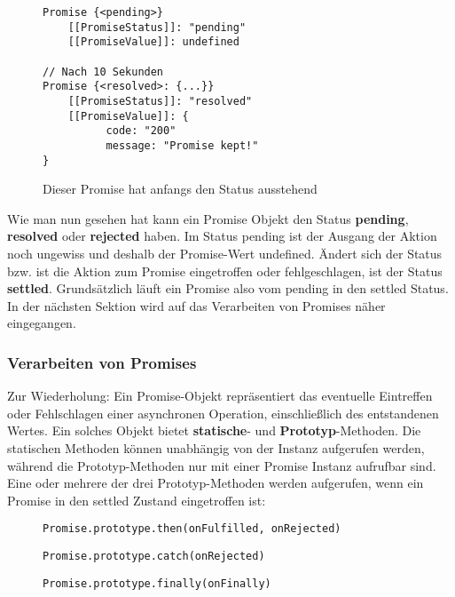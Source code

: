 \begin{figure}[H]
\begin{lstlisting}[basicstyle=\small]
Promise {<pending>}
    [[PromiseStatus]]: "pending"
    [[PromiseValue]]: undefined
    
// Nach 10 Sekunden
Promise {<resolved>: {...}}
    [[PromiseStatus]]: "resolved"
    [[PromiseValue]]: {
          code: "200"
          message: "Promise kept!"
}
\end{lstlisting}
\caption{Dieser Promise hat anfangs den Status \glqq{}ausstehend\grqq{}}
\end{figure}

\noindent
Wie man nun gesehen hat kann ein Promise Objekt den Status \textbf{pending}, \textbf{resolved} oder \textbf{rejected} haben. Im Status pending ist der Ausgang der Aktion noch ungewiss und deshalb der Promise-Wert undefined. Ändert sich der Status bzw. ist die Aktion zum Promise eingetroffen oder fehlgeschlagen, ist der Status \textbf{settled}. Grundsätzlich läuft ein Promise also vom pending in den settled Status. In der nächsten Sektion wird auf das Verarbeiten von Promises näher eingegangen.

\subsubsection{Verarbeiten von Promises}

Zur Wiederholung: Ein Promise-Objekt repräsentiert das eventuelle Eintreffen oder Fehlschlagen einer asynchronen Operation, einschließlich des entstandenen Wertes. Ein solches Objekt bietet \textbf{statische}- und \textbf{Prototyp}-Methoden. Die statischen Methoden können unabhängig von der Instanz aufgerufen werden, während die Prototyp-Methoden nur mit einer Promise Instanz aufrufbar sind. Eine oder mehrere der drei Prototyp-Methoden werden aufgerufen, wenn ein Promise in den settled Zustand eingetroffen ist:

\begin{description}

\begin{figure}[H]
\item \begin{lstlisting}[basicstyle=\small]
Promise.prototype.then(onFulfilled, onRejected)
\end{lstlisting}
\end{figure}

\begin{figure}[H]
\item \begin{lstlisting}[basicstyle=\small]
Promise.prototype.catch(onRejected)
\end{lstlisting}
\end{figure}
 
\begin{figure}[H]
\item \begin{lstlisting}[basicstyle=\small]
Promise.prototype.finally(onFinally)
\end{lstlisting}
\end{figure}
 
\end{description}

